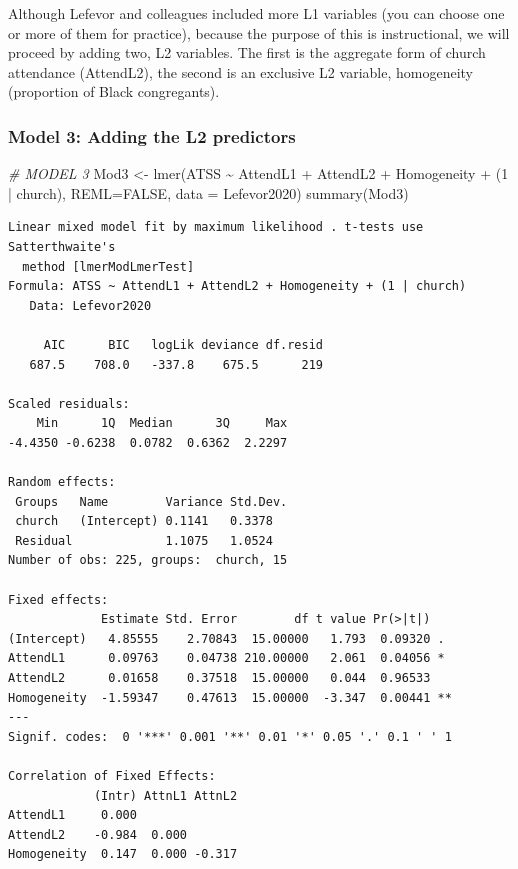 \documentclass[
  english,
]{book}
\newenvironment{Shaded}{\begin{snugshade}}{\end{snugshade}}
\newcommand{\AttributeTok}[1]{\textcolor[rgb]{0.77,0.63,0.00}{#1}}
\newcommand{\CommentTok}[1]{\textcolor[rgb]{0.56,0.35,0.01}{\textit{#1}}}
\newcommand{\ConstantTok}[1]{\textcolor[rgb]{0.00,0.00,0.00}{#1}}
\newcommand{\DecValTok}[1]{\textcolor[rgb]{0.00,0.00,0.81}{#1}}
\newcommand{\FunctionTok}[1]{\textcolor[rgb]{0.00,0.00,0.00}{#1}}
\newcommand{\NormalTok}[1]{#1}
\newcommand{\OtherTok}[1]{\textcolor[rgb]{0.56,0.35,0.01}{#1}}
\newcommand{\SpecialCharTok}[1]{\textcolor[rgb]{0.00,0.00,0.00}{#1}}
\begin{document}
Although Lefevor and colleagues \citeyearpar{lefevor_homonegativity_2020} included more L1 variables (you can choose one or more of them for practice), because the purpose of this is instructional, we will proceed by adding two, L2 variables. The first is the aggregate form of church attendance (AttendL2), the second is an exclusive L2 variable, homogeneity (proportion of Black congregants).

\hypertarget{model-3-adding-the-l2-predictors}{%
\subsubsection{Model 3: Adding the L2 predictors}\label{model-3-adding-the-l2-predictors}}

\begin{Shaded}
\begin{Highlighting}[]
\CommentTok{\# MODEL 3}
\NormalTok{Mod3 }\OtherTok{\textless{}{-}} \FunctionTok{lmer}\NormalTok{(ATSS }\SpecialCharTok{\textasciitilde{}}\NormalTok{ AttendL1 }\SpecialCharTok{+}\NormalTok{ AttendL2 }\SpecialCharTok{+}\NormalTok{ Homogeneity }\SpecialCharTok{+}\NormalTok{ (}\DecValTok{1} \SpecialCharTok{|}\NormalTok{ church), }\AttributeTok{REML=}\ConstantTok{FALSE}\NormalTok{, }\AttributeTok{data =}\NormalTok{ Lefevor2020)}
\FunctionTok{summary}\NormalTok{(Mod3)}
\end{Highlighting}
\end{Shaded}

\begin{verbatim}
Linear mixed model fit by maximum likelihood . t-tests use Satterthwaite's
  method [lmerModLmerTest]
Formula: ATSS ~ AttendL1 + AttendL2 + Homogeneity + (1 | church)
   Data: Lefevor2020

     AIC      BIC   logLik deviance df.resid 
   687.5    708.0   -337.8    675.5      219 

Scaled residuals: 
    Min      1Q  Median      3Q     Max 
-4.4350 -0.6238  0.0782  0.6362  2.2297 

Random effects:
 Groups   Name        Variance Std.Dev.
 church   (Intercept) 0.1141   0.3378  
 Residual             1.1075   1.0524  
Number of obs: 225, groups:  church, 15

Fixed effects:
             Estimate Std. Error        df t value Pr(>|t|)   
(Intercept)   4.85555    2.70843  15.00000   1.793  0.09320 . 
AttendL1      0.09763    0.04738 210.00000   2.061  0.04056 * 
AttendL2      0.01658    0.37518  15.00000   0.044  0.96533   
Homogeneity  -1.59347    0.47613  15.00000  -3.347  0.00441 **
---
Signif. codes:  0 '***' 0.001 '**' 0.01 '*' 0.05 '.' 0.1 ' ' 1

Correlation of Fixed Effects:
            (Intr) AttnL1 AttnL2
AttendL1     0.000              
AttendL2    -0.984  0.000       
Homogeneity  0.147  0.000 -0.317
\end{verbatim}
\end{document}
